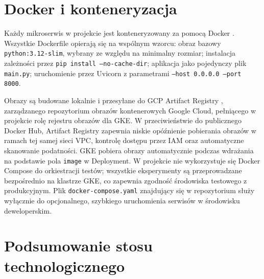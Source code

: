 \section{Docker i konteneryzacja}

Każdy mikroserwis w projekcie jest konteneryzowany za pomocą Docker \cite{docker2023}. Wszystkie Dockerfile opierają się na wspólnym wzorcu: obraz bazowy \texttt{python:3.12-slim}, wybrany ze względu na minimalny rozmiar; instalacja zależności przez \texttt{pip install --no-cache-dir}; aplikacja jako pojedynczy plik \texttt{main.py}; uruchomienie przez Uvicorn z parametrami \texttt{--host 0.0.0.0 --port 8000}.

Obrazy są budowane lokalnie i przesyłane do GCP Artifact Registry \cite{gcp-artifact-registry}, zarządzanego repozytorium obrazów kontenerowych Google Cloud, pełniącego w projekcie rolę rejestru obrazów dla GKE. W przeciwieństwie do publicznego Docker Hub, Artifact Registry zapewnia niskie opóźnienie pobierania obrazów w ramach tej samej sieci VPC, kontrolę dostępu przez IAM oraz automatyczne skanowanie podatności. GKE pobiera obrazy automatycznie podczas wdrażania na podstawie pola \texttt{image} w Deployment. W projekcie nie wykorzystuje się Docker Compose do orkiestracji testów; wszystkie eksperymenty są przeprowadzane bezpośrednio na klastrze GKE, co zapewnia zgodność środowiska testowego z produkcyjnym. Plik \texttt{docker-compose.yaml} znajdujący się w repozytorium służy wyłącznie do opcjonalnego, szybkiego uruchomienia serwisów w środowisku deweloperskim.

\section{Podsumowanie stosu technologicznego}

